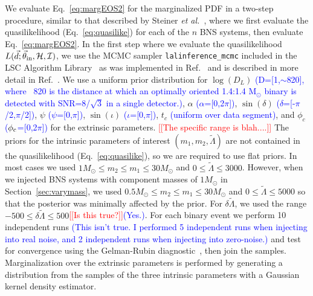 \documentclass[twocolumn,prd,amssymb,aps,nofootinbib,showpacs,epsf]{revtex4}
\newcommand{\red}{\textcolor{red}}
\newcommand\les[2]{\textcolor{blue}{{#1}\sout{#2}}}
\begin{document}
We evaluate Eq.~\eqref{eq:margEOS2} for the marginalized PDF in a two-step procedure, similar to that described by Steiner {\it et al.}~\cite{SteinerLattimerBrown2010}, where we first evaluate the quasilikelihood (Eq.~\eqref{eq:quasilike}) for each of the $n$ BNS systems, then evaluate Eq.~\eqref{eq:margEOS2}. In the first step where we evaluate the quasilikelihood $L(\vec d; \vec\theta_{\rm in}, \mathcal{H}, \mathcal{I})$, we use the MCMC sampler \texttt{lalinference\_mcmc} included in the LSC Algorithm Library~\cite{lal} as was implemented in Ref.~\cite{WadeCreightonOchsner2014} and is described in more detail in Ref.~\cite{VanDerSluysRaymondMandel2008}. We use a uniform prior distribution for $\log(D_L)$ \les{(D=[1,$\sim$820], where ~820 is the distance at which an optimally oriented 1.4:1.4 M$_\odot$ binary is detected with SNR=8/$\sqrt{3}$ in a single detector.)}{}, $\alpha$ \les{($\alpha$=[0,2$\pi$])}{}, $\sin(\delta)$ \les{($\delta$=[-$\pi$/2,$\pi$/2])}{}, $\psi$ \les{($\psi$=[0,$\pi$])}{}, $\sin(\iota)$ \les{($\iota$=[0,$\pi$])}{}, $t_c$ \les{(uniform over data segment)}{}, and $\phi_c$ \les{($\phi_{\rm c}$=[0,2$\pi$])}{} for the extrinsic parameters. \red{[[The specific range is blah....]]} The priors for the intrinsic parameters of interest $(m_{1}, m_{2}, \tilde\Lambda)$ are not contained in the quasilikelihood (Eq.~\eqref{eq:quasilike}), so we are required to use flat priors. In most cases we used $1M_\odot \le m_2 \le m_1 \le 30M_\odot$ and $0 \le \tilde\Lambda \le 3000$. However, when we injected BNS systems with component masses of $1M_\odot$ in Section~\ref{sec:varymass}, we used $0.5M_\odot \le m_2 \le m_1 \le 30M_\odot$ and $0 \le \tilde\Lambda \le 5000$ so that the posterior was minimally affected by the prior. For $\delta\tilde\Lambda$, we used the range $-500 \le \delta\tilde\Lambda \le 500$\red{[[Is this true?]]}\les{(Yes.)}{}. For each binary event we perform 10 independent runs \les{(This isn't true.  I performed 5 independent runs when injecting into real noise, and 2 independent runs when injecting into zero-noise.)}{} and test for convergence using the Gelman-Rubin diagnostic~\cite{GelmanRubin1992}, then join the samples. Marginalization over the extrinsic parameters is performed by generating a distribution from the samples of the three intrinsic parameters with a Gaussian kernel density estimator. 
\end{document}

